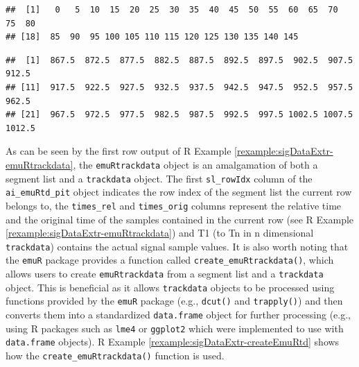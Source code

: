 \documentclass[]{book}
\newenvironment{Shaded}{\begin{snugshade}}{\end{snugshade}}
\newcommand{\CommentTok}[1]{\textcolor[rgb]{0.56,0.35,0.01}{\textit{#1}}}
\newcommand{\DecValTok}[1]{\textcolor[rgb]{0.00,0.00,0.81}{#1}}
\newcommand{\NormalTok}[1]{#1}
\newcommand{\OperatorTok}[1]{\textcolor[rgb]{0.81,0.36,0.00}{\textbf{#1}}}
\newcommand{\StringTok}[1]{\textcolor[rgb]{0.31,0.60,0.02}{#1}}
\theoremstyle{definition}
\theoremstyle{definition}
\theoremstyle{definition}
\theoremstyle{remark}
\begin{document}
\begin{Shaded}
\end{Shaded}

\begin{verbatim}
##  [1]   0   5  10  15  20  25  30  35  40  45  50  55  60  65  70  75  80
## [18]  85  90  95 100 105 110 115 120 125 130 135 140 145
\end{verbatim}

\begin{Shaded}
\end{Shaded}

\begin{verbatim}
##  [1]  867.5  872.5  877.5  882.5  887.5  892.5  897.5  902.5  907.5  912.5
## [11]  917.5  922.5  927.5  932.5  937.5  942.5  947.5  952.5  957.5  962.5
## [21]  967.5  972.5  977.5  982.5  987.5  992.5  997.5 1002.5 1007.5 1012.5
\end{verbatim}

As can be seen by the first row output of R Example
\ref{rexample:sigDataExtr-emuRtrackdata}, the \texttt{emuRtrackdata}
object is an amalgamation of both a segment list and a
\texttt{trackdata} object. The first \texttt{sl\_rowIdx} column of the
\texttt{ai\_emuRtd\_pit} object indicates the row index of the segment
list the current row belongs to, the \texttt{times\_rel} and
\texttt{times\_orig} columns represent the relative time and the
original time of the samples contained in the current row (see R Example
\ref{rexample:sigDataExtr-emuRtrackdata}) and T1 (to Tn in n dimensional
\texttt{trackdata}) contains the actual signal sample values. It is also
worth noting that the \texttt{emuR} package provides a function called
\texttt{create\_emuRtrackdata()}, which allows users to create
\texttt{emuRtrackdata} from a segment list and a \texttt{trackdata}
object. This is beneficial as it allows \texttt{trackdata} objects to be
processed using functions provided by the \texttt{emuR} package (e.g.,
\texttt{dcut()} and \texttt{trapply()}) and then converts them into a
standardized \texttt{data.frame} object for further processing (e.g.,
using R packages such as \texttt{lme4} or \texttt{ggplot2} which were
implemented to use with \texttt{data.frame} objects). R Example
\ref{rexample:sigDataExtr-createEmuRtd} shows how the
\texttt{create\_emuRtrackdata()} function is used.
\end{document}
